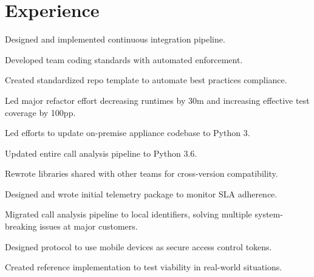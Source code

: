 \documentclass[]{deedy-resume-openfont}
\begin{document}
\begin{minipage}[t]{0.64\textwidth}


\section{Experience}
\vspace{\topsep} %
\begin{tightemize}
\item Designed and implemented continuous integration pipeline.
\item Developed team coding standards with automated enforcement.
\item Created standardized repo template to automate best practices compliance.
\item Led major refactor effort decreasing runtimes by 30m and increasing effective test coverage by 100pp.
\end{tightemize}
\sectionsep

\begin{tightemize}
\item Led efforts to update on-premise appliance codebase to Python 3.
\item Updated entire call analysis pipeline to Python 3.6.
\item Rewrote libraries shared with other teams for cross-version compatibility.
\item Designed and wrote initial telemetry package to monitor SLA adherence. 
\item Migrated call analysis pipeline to local identifiers, solving multiple system-breaking issues at major customers.
\end{tightemize}
\sectionsep

\begin{tightemize}
\item Designed protocol to use mobile devices as secure access control tokens.
\item Created reference implementation to test viability in real-world situations.
\end{tightemize}
\sectionsep


\end{minipage}
\end{document}

